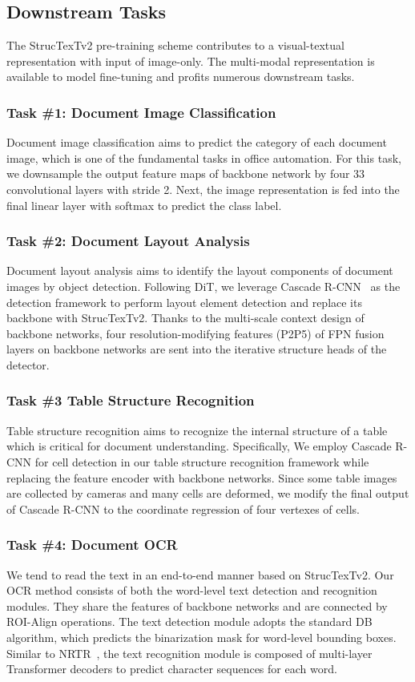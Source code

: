 \documentclass{article} \usepackage{iclr2023_conference,times}
\begin{document}
\subsection{Downstream Tasks}

The StrucTexTv2 pre-training scheme contributes to a visual-textual representation with input of image-only. The multi-modal representation is available to model fine-tuning and profits numerous downstream tasks.

\subsubsection{Task \#1: Document Image Classification}
Document image classification aims to predict the category of each document image, which is one of the fundamental tasks in office automation. For this task, we downsample the output feature maps of backbone network by four 33 convolutional layers with stride 2. Next, the image representation is fed into the final linear layer with softmax to predict the class label.


\subsubsection{Task \#2: Document Layout Analysis}
Document layout analysis aims to identify the layout components of document images by object detection. Following DiT, we leverage Cascade R-CNN~\cite{cai2018cascade} as the detection framework to perform layout element detection and replace its backbone with StrucTexTv2. Thanks to the multi-scale context design of backbone networks, four resolution-modifying features (P2P5) of FPN fusion layers on backbone networks are sent into the iterative structure heads of the detector.

\subsubsection{Task \#3 Table Structure Recognition}
Table structure recognition aims to recognize the internal structure of a table which is critical for document understanding. Specifically, We employ Cascade R-CNN for cell detection in our table structure recognition framework while replacing the feature encoder with backbone networks. Since some table images are collected by cameras and many cells are deformed, we modify the final output of Cascade R-CNN to the coordinate regression of four vertexes of cells.

\subsubsection{Task \#4: Document OCR}
We tend to read the text in an end-to-end manner based on StrucTexTv2.
Our OCR method consists of both the word-level text detection and recognition modules. They share the features of backbone networks and are connected by ROI-Align operations. The text detection module adopts the standard DB~\cite{liao2020real} algorithm, which predicts the binarization mask for word-level bounding boxes. Similar to NRTR~\cite{sheng2019nrtr}, the text recognition module is composed of multi-layer Transformer decoders to predict character sequences for each word.
\end{document}
